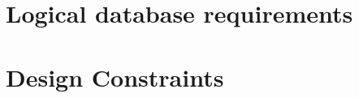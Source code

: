 \documentclass{report}
\begin{document}
  \section{Logical database requirements}
  

  \section{Design Constraints}
  


\listoftables
\end{document}
